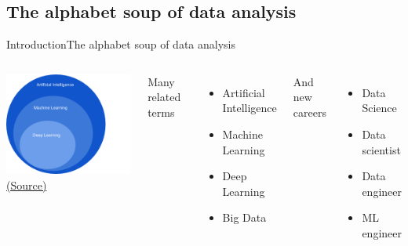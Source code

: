 \documentclass[10pt,compress]{beamer} %
\begin{document}
\subsection{The alphabet soup of data analysis}
\begin{frame}{Introduction}{The alphabet soup of data analysis}
	\begin{columns}
	    \begin{center}

	    \includegraphics[width=0.8\linewidth]{figs/comparativa.png}\\
        \tiny{\href{https://www.linkfluence.com/blog/ai-basics-how-ai-machine-learning-supercharge-social-media-marketing}{(Source)}}
	    \end{center}

	Many related terms
		\begin{itemize}
		\item Artificial Intelligence
		\item Machine Learning
		\item Deep Learning
		\item Big Data
        \end{itemize}
    And new careers
	    \begin{itemize}
		\item Data Science
		\item Data scientist
		\item Data engineer
		\item ML engineer
		\end{itemize}
    \end{columns}
\end{frame}
\end{document}
